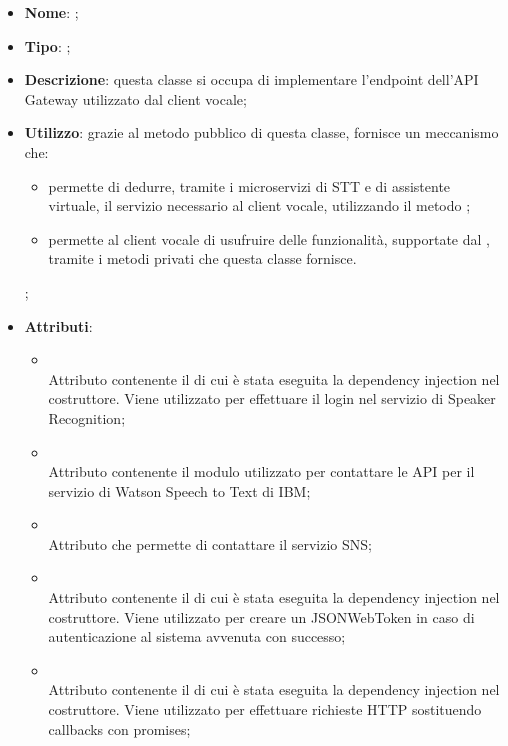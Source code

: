 \begin{itemize}
	\item \textbf{Nome}: ;
	\item \textbf{Tipo}: ;
	\item \textbf{Descrizione}: questa classe si occupa di implementare l'endpoint dell'API Gateway utilizzato dal client vocale;
	\item \textbf{Utilizzo}: grazie al metodo pubblico di questa classe, fornisce un meccanismo che:
\begin{itemize}
  \item permette di dedurre, tramite i microservizi di STT e di assistente virtuale, il servizio necessario al client vocale, utilizzando il metodo ;
  \item permette al client vocale di usufruire delle funzionalità, supportate dal , tramite i metodi privati che questa classe fornisce.
\end{itemize}
;
	\item \textbf{Attributi}:
	\begin{itemize}
		\item[]  \\
		Attributo contenente il  di cui è stata eseguita la dependency injection nel costruttore. Viene utilizzato per effettuare il login nel servizio di Speaker Recognition;
		\item[]  \\
		Attributo contenente il modulo utilizzato per contattare le API per il servizio di Watson Speech to Text di IBM;
		\item[]  \\
		Attributo che permette di contattare il servizio SNS;
		\item[]  \\
		Attributo contenente il  di cui è stata eseguita la dependency injection nel costruttore. Viene utilizzato per creare un JSONWebToken in caso di autenticazione al sistema avvenuta con successo;
		\item[]  \\
		Attributo contenente il  di cui è stata eseguita la dependency injection nel costruttore. Viene utilizzato per effettuare richieste HTTP sostituendo callbacks con promises;
	\end{itemize}

\end{itemize}
